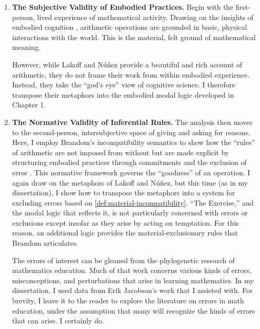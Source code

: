 \documentclass[12pt]{book}
\begin{document}
\begin{enumerate}
 \item \textbf{The Subjective Validity of Embodied Practices.} Begin with the first-person, lived experience of mathematical activity. Drawing on the insights of embodied cognition \parencite{Lakoff2000}, arithmetic operations are grounded in basic, physical interactions with the world. This is the material, felt ground of mathematical meaning.

 However, while Lakoff and Núñez \parencite*{Lakoff2000} provide a beautiful and rich account of arithmetic, they do not frame their work from within embodied experience. Instead, they take the ``god's eye'' view of cognitive science. I therefore transpose their metaphors into the embodied modal logic developed in Chapter 1.

 \item \textbf{The Normative Validity of Inferential Rules.} The analysis then moves to the second-person, intersubjective space of giving and asking for reasons. Here, I employ Brandom's incompatibility semantics to show how the ``rules'' of arithmetic are not imposed from without but are made explicit by structuring embodied practices through commitments and the exclusion of error \parencite{Brandom2008}. This normative framework governs the ``goodness'' of an operation. I again draw on the metaphors of Lakoff and Núñez, but this time (as in my dissertation), I show how to transpose the metaphors into a system for excluding errors based on \ref{def:material-incompatibility}. ``The Exercise,'' and the modal logic that reflects it, is not particularly concerned with errors or exclusions except insofar as they arise by acting on temptation. For this reason, an additional logic provides the material-exclusionary rules that Brandom articulates.

The errors of interest can be gleaned from the phylogenetic research of mathematics education. Much of that work concerns various kinds of errors, misconceptions, and perturbations that arise in learning mathematics. In my dissertation, I used data from Erik Jacobson's work that I assisted with. For brevity, I leave it to the reader to explore the literature on errors in math education, under the assumption that many will recognize the kinds of errors that can arise. I certainly do.


\end{enumerate}
\end{document}
